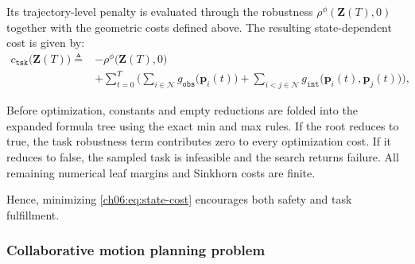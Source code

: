 Its trajectory-level penalty is evaluated through the robustness
$\rho^\phi(\mathbf{Z}(T),0)$ together with the geometric costs defined
above.
The resulting state-dependent cost is given by:
\begin{equation}
\label{ch06:eq:state-cost}
\begin{aligned}
c_{\texttt{tsk}}\big(\mathbf{Z}(T)\big)\triangleq
&-\rho^\phi\big(\mathbf{Z}(T),0\big) \\
&+\sum_{t=0}^{T}
\Bigg(
\sum_{i\in\mathcal{N}} g_{\texttt{obs}}\big(\mathbf{p}_i(t)\big)
+\sum_{i<j\in\mathcal{N}}
g_{\texttt{int}}\big(\mathbf{p}_i(t),\mathbf{p}_j(t)\big)
\Bigg),
\end{aligned}
\end{equation}
\begin{revision}
Before optimization, constants and empty reductions are folded into the
expanded formula tree using the exact min and max rules. If the root reduces
to true, the task robustness term contributes zero to every optimization cost.
If it reduces to false, the sampled task is infeasible and the search returns
failure. All remaining numerical leaf margins and Sinkhorn costs are finite.
\end{revision}
Hence, minimizing \eqref{ch06:eq:state-cost} encourages both safety and
task fulfillment.

\subsubsection{Collaborative motion planning problem}


